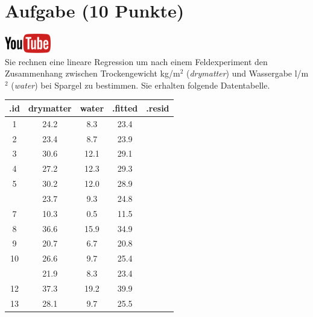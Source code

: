 \documentclass[a4paper, 9pt]{scrartcl}\usepackage[]{graphicx}\usepackage[]{xcolor}
\newenvironment{knitrout}{}{} %
\begin{document}
\section{Aufgabe \hfill (10 Punkte)}

\hfill\href{https://youtu.be/dyQlYV9nOqY}{\includegraphics[width =
  2cm]{img/youtube}}\\[1Ex]

Sie rechnen eine lineare Regression um nach einem Feldexperiment den
Zusammenhang zwischen Trockengewicht kg/m$^2$ (\textit{drymatter}) und
Wassergabe l/m$^2$ (\textit{water}) bei Spargel zu bestimmen. Sie erhalten
folgende Datentabelle.

\begin{knitrout}
\color{fgcolor}\begin{table}[!h]
\centering\begingroup\fontsize{12}{14}\selectfont

\begin{tabular}{ccccc}
\toprule
.id & drymatter & water & .fitted & .resid\\
\midrule
1 & 24.2 & 8.3 & 23.4 & \\
2 & 23.4 & 8.7 & 23.9 & \\
3 & 30.6 & 12.1 & 29.1 & \\
4 & 27.2 & 12.3 & 29.3 & \\
5 & 30.2 & 12.0 & 28.9 & \\
\addlinespace
6 & 23.7 & 9.3 & 24.8 & \\
7 & 10.3 & 0.5 & 11.5 & \\
8 & 36.6 & 15.9 & 34.9 & \\
9 & 20.7 & 6.7 & 20.8 & \\
10 & 26.6 & 9.7 & 25.4 & \\
\addlinespace
11 & 21.9 & 8.3 & 23.4 & \\
12 & 37.3 & 19.2 & 39.9 & \\
13 & 28.1 & 9.7 & 25.5 & \\
\bottomrule
\end{tabular}
\endgroup{}
\end{table}

\end{knitrout}
\end{document}
